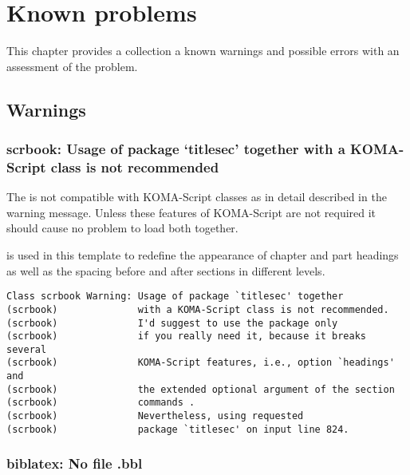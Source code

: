 \chapter{Known problems}
\label{chap:doc:problems}

This chapter provides a collection a known warnings and possible errors with an assessment of the problem.

\section{Warnings}

\subsection{scrbook: Usage of package `titlesec' together with a KOMA-Script class is not recommended}

The  is not compatible with KOMA-Script classes as in
detail described in the warning message. Unless these features of KOMA-Script
are not required it should cause no problem to load both together. 

 is used in this template to redefine the appearance of 
chapter and part headings as well as the spacing before and after 
sections in different levels.

\begin{verbatim}
Class scrbook Warning: Usage of package `titlesec' together
(scrbook)              with a KOMA-Script class is not recommended.
(scrbook)              I'd suggest to use the package only
(scrbook)              if you really need it, because it breaks several
(scrbook)              KOMA-Script features, i.e., option `headings' and
(scrbook)              the extended optional argument of the section
(scrbook)              commands .
(scrbook)              Nevertheless, using requested
(scrbook)              package `titlesec' on input line 824.
\end{verbatim}


\subsection{biblatex: No file \texorpdfstring{}{filename}.bbl}

